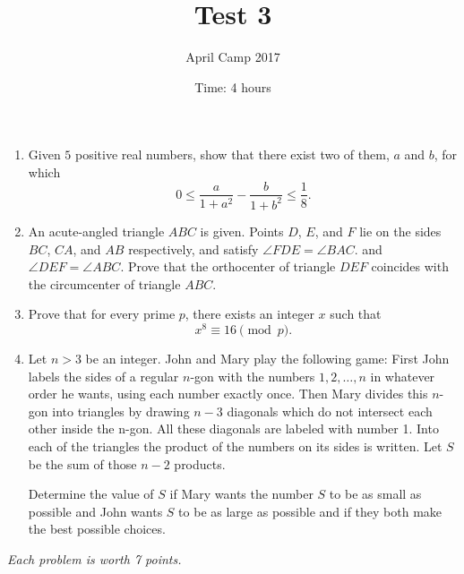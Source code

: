 \documentclass[a4paper,12pt]{article}
\title{Test 3}
\date{Time: 4 hours}
\author{April Camp 2017}
\begin{document}
 \maketitle

\begin{enumerate}
	\item %
	Given $5$ positive real numbers, show that there exist two of them,
	$a$ and $b$, for which
	\[
		0 \leq \frac{a}{1+a^2} - \frac{b}{1+b^2} \leq \frac{1}{8}.
	\]

	\item %
	An acute-angled triangle $ABC$ is given. Points $D$, $E$, and $F$ lie
	on the sides $BC$, $CA$, and $AB$ respectively, and satisfy $\angle
	FDE = \angle BAC$. and $\angle DEF = \angle ABC$. Prove that the
	orthocenter of triangle $DEF$ coincides with the circumcenter of
	triangle $ABC$.

	\item 
	Prove that for every prime $p$, there exists an integer $x$ such that \[x^8 \equiv 16 \pmod p.\]

	\item 
	Let $n > 3$ be an integer. John and Mary play the following game: First John labels the sides of a regular $n$-gon with the numbers $1, 2, \dotsc, n$ in whatever order he wants, using each number exactly once. Then Mary divides this $n$-gon into triangles by drawing $n − 3$ diagonals which do not intersect each other inside the n-gon. All these diagonals are labeled with number 1. Into each of the triangles the product of the numbers on its sides is written. Let $S$ be the sum of those $n − 2$ products.
	
Determine the value of $S$ if Mary wants the number $S$ to be as small as possible and John wants $S$ to be as large as possible and if they both make the best possible choices.

\end{enumerate}

\medskip 

\hfill \emph{Each problem is worth 7 points.}
	
\end{document}
